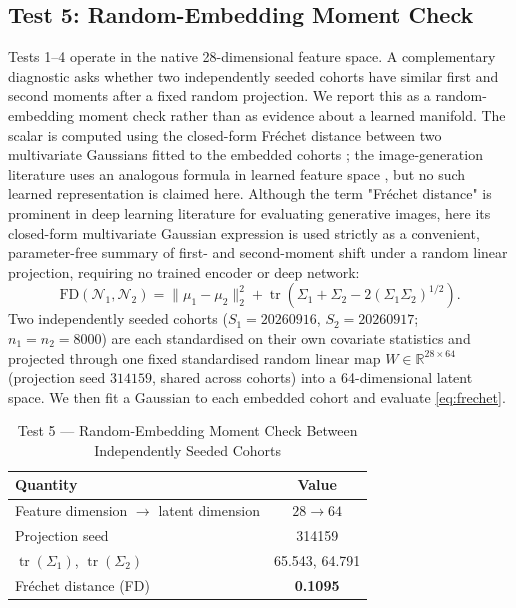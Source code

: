 \documentclass[journal]{IEEEtran}
\begin{document}
\subsection{Test 5: Random-Embedding Moment Check}
\label{sec:frechet}
Tests 1--4 operate in the native 28-dimensional feature space. A complementary diagnostic asks whether two independently seeded cohorts have similar first and second moments after a fixed random projection. We report this as a random-embedding moment check rather than as evidence about a learned manifold. The scalar is computed using the closed-form Fr\'{e}chet distance between two multivariate Gaussians fitted to the embedded cohorts \cite{dowson1982frechet}; the image-generation literature uses an analogous formula in learned feature space \cite{heusel2017fid}, but no such learned representation is claimed here. Although the term "Fr\'{e}chet distance" is prominent in deep learning literature for evaluating generative images, here its closed-form multivariate Gaussian expression is used strictly as a convenient, parameter-free summary of first- and second-moment shift under a random linear projection, requiring no trained encoder or deep network:
\begin{equation}
\text{FD}(\mathcal{N}_1,\mathcal{N}_2) = \lVert \mu_1-\mu_2\rVert_2^2 + \operatorname{tr}\!\left(\Sigma_1+\Sigma_2-2(\Sigma_1\Sigma_2)^{1/2}\right).
\label{eq:frechet}
\end{equation}
Two independently seeded cohorts ($S_1=20260916$, $S_2=20260917$; $n_1=n_2=8000$) are each standardised on their own covariate statistics and projected through one fixed standardised random linear map $W\in\mathbb{R}^{28\times64}$ (projection seed $314159$, shared across cohorts) into a 64-dimensional latent space. We then fit a Gaussian to each embedded cohort and evaluate \eqref{eq:frechet}.

\begin{table}[!t]
\caption{Test 5 --- Random-Embedding Moment Check Between Independently Seeded Cohorts}
\label{tab:frechet}
\centering
\footnotesize
\begin{tabular}{@{}lc@{}}
\toprule
Quantity & Value \\
\midrule
Feature dimension $\to$ latent dimension & $28\to64$ \\
Projection seed & 314159 \\
$\operatorname{tr}(\Sigma_1)$, $\operatorname{tr}(\Sigma_2)$ & 65.543, 64.791 \\
Fr\'{e}chet distance (FD) & \textbf{0.1095} \\
\bottomrule
\end{tabular}
\end{table}
\end{document}
